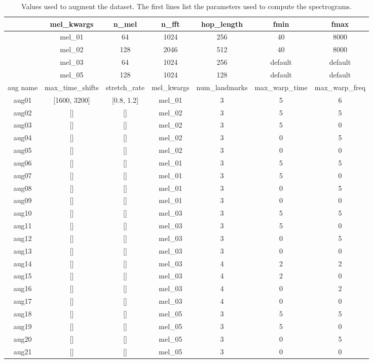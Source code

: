\begin{table*}[h!]
    \centering
    \caption{Values used to augment the dataset. The first lines list the parameters used to compute the spectrograms.}
    \label{tab:aug_values}
    \begin{tabular}{|c|cccccc|}
        \hline
        & mel\_kwargs & n\_mel & n\_fft & hop\_length & fmin & fmax \\
        \hline
        \hline
        & mel\_01 & 64 & 1024 & 256 & 40 & 8000  \\
        & mel\_02 & 128 & 2046 & 512 & 40 & 8000  \\
        & mel\_03 & 64 & 1024 & 256 & default & default  \\
        & mel\_05 & 128 & 1024 & 128 & default & default  \\
        \hline
        \hline
        aug name & max\_time\_shifts & stretch\_rate & mel\_kwargs & num\_landmarks & max\_warp\_time & max\_warp\_freq\\
        \hline
        \hline
        aug01 &  [1600, 3200] & [0.8, 1.2] & mel\_01 & 3 & 5 & 6 \\
        \hline
        aug02 &  [] & [] & mel\_02 & 3 & 5 & 5 \\
        aug03 &  [] & [] & mel\_02 & 3 & 5 & 0 \\
        aug04 &  [] & [] & mel\_02 & 3 & 0 & 5 \\
        aug05 &  [] & [] & mel\_02 & 3 & 0 & 0 \\
        \hline
        aug06 &  [] & [] & mel\_01 & 3 & 5 & 5 \\
        aug07 &  [] & [] & mel\_01 & 3 & 5 & 0 \\
        aug08 &  [] & [] & mel\_01 & 3 & 0 & 5 \\
        aug09 &  [] & [] & mel\_01 & 3 & 0 & 0 \\
        \hline
        aug10 &  [] & [] & mel\_03 & 3 & 5 & 5 \\
        aug11 &  [] & [] & mel\_03 & 3 & 5 & 0 \\
        aug12 &  [] & [] & mel\_03 & 3 & 0 & 5 \\
        aug13 &  [] & [] & mel\_03 & 3 & 0 & 0 \\
        \hline
        aug14 &  [] & [] & mel\_03 & 4 & 2 & 2 \\
        aug15 &  [] & [] & mel\_03 & 4 & 2 & 0 \\
        aug16 &  [] & [] & mel\_03 & 4 & 0 & 2 \\
        aug17 &  [] & [] & mel\_03 & 4 & 0 & 0 \\
        \hline
        aug18 &  [] & [] & mel\_05 & 3 & 5 & 5 \\
        aug19 &  [] & [] & mel\_05 & 3 & 5 & 0 \\
        aug20 &  [] & [] & mel\_05 & 3 & 0 & 5 \\
        aug21 &  [] & [] & mel\_05 & 3 & 0 & 0 \\
        \hline
    \end{tabular}
\end{table*}

